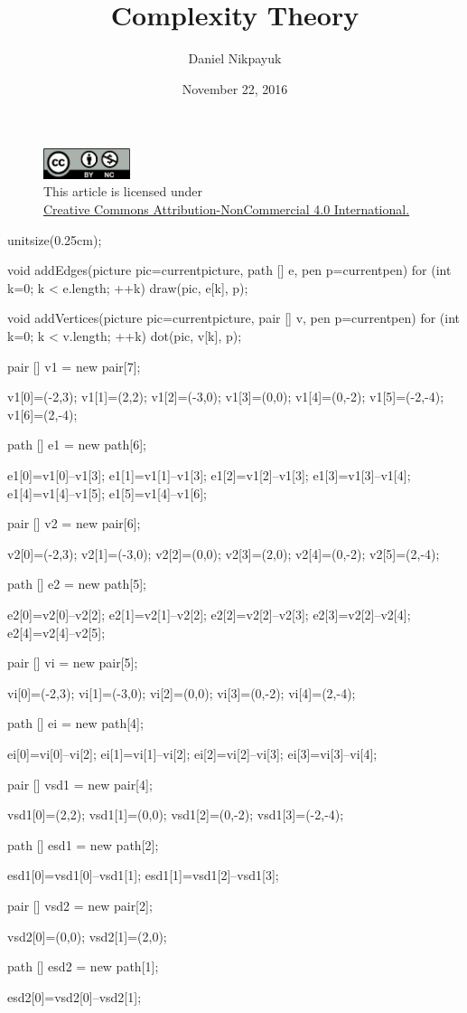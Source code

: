 \documentclass[twoside]{article}
\title{Complexity Theory}
\author{Daniel Nikpayuk}
\date{November 22, 2016}
\begin{document}
\maketitle
\thispagestyle{empty}

\begin{figure}[h]
\centering
\includegraphics[width=1in]{../../../cc-by-nc.png}\\[0.1in]
\tiny This article is licensed under \\
\href{http://creativecommons.org/licenses/by-nc/4.0/}
{Creative Commons Attribution-NonCommercial 4.0 International.}\\[0.3in]
\end{figure}

\begin{asydef}

unitsize(0.25cm);

void addEdges(picture pic=currentpicture, path [] e, pen p=currentpen)
{
	for (int k=0; k < e.length; ++k) draw(pic, e[k], p);
}

void addVertices(picture pic=currentpicture, pair [] v, pen p=currentpen)
{
	for (int k=0; k < v.length; ++k) dot(pic, v[k], p);
}

pair [] v1 = new pair[7];

v1[0]=(-2,3);
v1[1]=(2,2);
v1[2]=(-3,0);
v1[3]=(0,0);
v1[4]=(0,-2);
v1[5]=(-2,-4);
v1[6]=(2,-4);

path [] e1 = new path[6];

e1[0]=v1[0]--v1[3];
e1[1]=v1[1]--v1[3];
e1[2]=v1[2]--v1[3];
e1[3]=v1[3]--v1[4];
e1[4]=v1[4]--v1[5];
e1[5]=v1[4]--v1[6];

pair [] v2 = new pair[6];

v2[0]=(-2,3);
v2[1]=(-3,0);
v2[2]=(0,0);
v2[3]=(2,0);
v2[4]=(0,-2);
v2[5]=(2,-4);

path [] e2 = new path[5];

e2[0]=v2[0]--v2[2];
e2[1]=v2[1]--v2[2];
e2[2]=v2[2]--v2[3];
e2[3]=v2[2]--v2[4];
e2[4]=v2[4]--v2[5];

pair [] vi = new pair[5];

vi[0]=(-2,3);
vi[1]=(-3,0);
vi[2]=(0,0);
vi[3]=(0,-2);
vi[4]=(2,-4);

path [] ei = new path[4];

ei[0]=vi[0]--vi[2];
ei[1]=vi[1]--vi[2];
ei[2]=vi[2]--vi[3];
ei[3]=vi[3]--vi[4];

pair [] vsd1 = new pair[4];

vsd1[0]=(2,2);
vsd1[1]=(0,0);
vsd1[2]=(0,-2);
vsd1[3]=(-2,-4);

path [] esd1 = new path[2];

esd1[0]=vsd1[0]--vsd1[1];
esd1[1]=vsd1[2]--vsd1[3];

pair [] vsd2 = new pair[2];

vsd2[0]=(0,0);
vsd2[1]=(2,0);

path [] esd2 = new path[1];

esd2[0]=vsd2[0]--vsd2[1];

\end{asydef}
\end{document}
